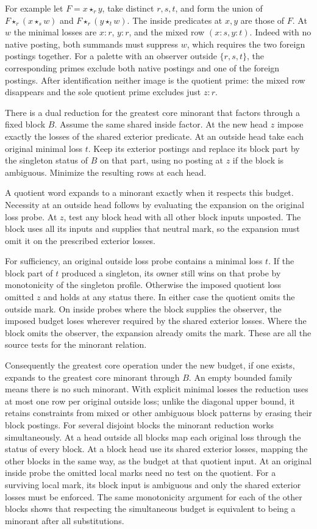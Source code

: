 For example let $F=x\star_r y$, take distinct
$r,s,t$, and form the union of
$F\star_r(x\star_s w)$ and $F\star_r(y\star_t w)$.
The inside predicates at $x,y$ are those of $F$.
At $w$ the minimal losses are $x{:}r$, $y{:}r$,
and the mixed row $(x{:}s,y{:}t)$. Indeed with no
native posting, both summands must suppress $w$,
which requires the two foreign postings together.
For a palette with an observer outside $\{r,s,t\}$,
the corresponding primes exclude both native
postings and one of the foreign postings. After
identification neither image is the quotient prime:
the mixed row disappears and the sole quotient
prime excludes just $z{:}r$.

There is a dual reduction for the greatest core
minorant that factors through a fixed block $B$.
Assume the same shared inside factor. At the new
head $z$ impose exactly the losses of the shared
exterior predicate. At an outside head take each
original minimal loss $t$. Keep its exterior
postings and replace its block part by the singleton
status of $B$ on that part, using no posting at $z$
if the block is ambiguous. Minimize the resulting
rows at each head.

A quotient word expands to a minorant exactly when
it respects this budget. Necessity at an outside head
follows by evaluating the expansion on the original
loss probe. At $z$, test any block head with all other
block inputs unposted. The block uses all its inputs
and supplies that neutral mark, so the expansion must
omit it on the prescribed exterior losses.

For sufficiency, an original outside loss probe
contains a minimal loss $t$. If the block part of
$t$ produced a singleton, its owner still wins on
that probe by monotonicity of the singleton profile.
Otherwise the imposed quotient loss omitted $z$
and holds at any status there. In either case the
quotient omits the outside mark. On inside probes
where the block supplies the observer, the imposed
budget loses wherever required by the shared
exterior losses. Where the block omits the observer,
the expansion already omits the mark. These are all
the source tests for the minorant relation.

Consequently the greatest core operation under the
new budget, if one exists, expands to the greatest
core minorant through $B$. An empty bounded family
means there is no such minorant. With explicit
minimal losses the reduction uses at most one row
per original outside loss; unlike the diagonal
upper bound, it retains constraints from mixed or
other ambiguous block patterns by erasing their
block postings. For several disjoint blocks the
minorant reduction works simultaneously. At a head
outside all blocks map each original loss through
the status of every block. At a block head use its
shared exterior losses, mapping the other blocks
in the same way, as the budget at that quotient
input. At an original inside probe the omitted
local marks need no test on the quotient. For a
surviving local mark, its block input is ambiguous
and only the shared exterior losses must be
enforced. The same monotonicity argument for each
of the other blocks shows that respecting the
simultaneous budget is equivalent to being a
minorant after all substitutions.

